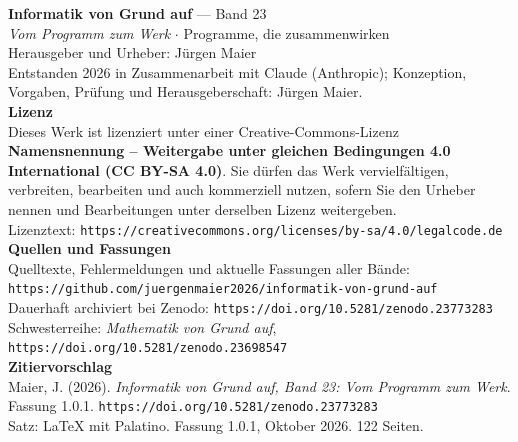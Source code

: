 \clearpage
\thispagestyle{empty}
\vspace*{\fill}
\begin{flushleft}
{\small\color{grau}
\textbf{\color{tief}Informatik von Grund auf} --- Band 23\\[2pt]
\textit{Vom Programm zum Werk} $\cdot$ Programme, die zusammenwirken\\[14pt]

Herausgeber und Urheber: Jürgen Maier\\[2pt]
Entstanden 2026 in Zusammenarbeit mit Claude (Anthropic); Konzeption, Vorgaben, Prüfung und Herausgeberschaft: Jürgen Maier.\\[14pt]

\textbf{Lizenz}\\[2pt]
Dieses Werk ist lizenziert unter einer Creative-Commons-Lizenz \textbf{Namensnennung -- Weitergabe unter gleichen Bedingungen 4.0 International (CC BY-SA 4.0)}. Sie dürfen das Werk vervielfältigen, verbreiten, bearbeiten und auch kommerziell nutzen, sofern Sie den Urheber nennen und Bearbeitungen unter derselben Lizenz weitergeben.\\[2pt]
Lizenztext: \texttt{https://creativecommons.org/licenses/by-sa/4.0/legalcode.de}\\[14pt]

\textbf{Quellen und Fassungen}\\[2pt]
Quelltexte, Fehlermeldungen und aktuelle Fassungen aller Bände:\\
\texttt{https://github.com/juergenmaier2026/informatik-von-grund-auf}\\[2pt]
Dauerhaft archiviert bei Zenodo: \texttt{https://doi.org/10.5281/zenodo.23773283}\\[2pt]
Schwesterreihe: \textit{Mathematik von Grund auf}, \texttt{https://doi.org/10.5281/zenodo.23698547}\\[14pt]

\textbf{Zitiervorschlag}\\[2pt]
Maier, J. (2026). \textit{Informatik von Grund auf, Band 23: Vom Programm zum Werk}. Fassung 1.0.1. \texttt{https://doi.org/10.5281/zenodo.23773283}\\[14pt]

Satz: \LaTeX{} mit Palatino. Fassung 1.0.1, Oktober 2026. 122 Seiten.
}
\end{flushleft}
\vspace*{1.5cm}
\clearpage
